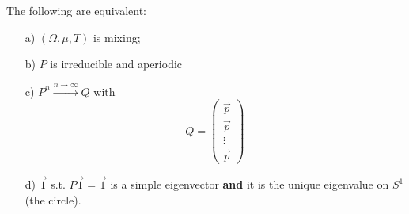 \begin{theorem}
    The following are equivalent:
    \begin{itemize}
        \item[a)] $(\Omega, \mu, T)$ is mixing;
        \item[b)] $P$ is irreducible and aperiodic
        \item[c)] $P^n \xrightarrow{n \rightarrow \infty} Q$ with 
        \begin{equation*}
            Q = 
            \begin{pmatrix}
                \Vec{p} \\
                \Vec{p} \\
                \vdots \\
                \Vec{p}
            \end{pmatrix}
        \end{equation*}
        \item[d)] $\Vec{1}$ s.t. $P \Vec{1} = \Vec{1}$ is a simple eigenvector \textbf{and} it is the unique eigenvalue on $S^1$ (the circle).
    \end{itemize}
\end{theorem}


